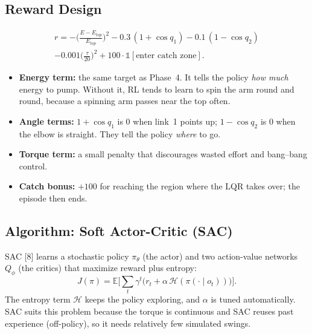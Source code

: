 \documentclass[12pt,a4paper]{article}
\begin{document}
\subsection{Reward Design}
\begin{multline}
r=-\Big(\frac{E-E_{top}}{E_{top}}\Big)^2-0.3\,(1+\cos q_1)-0.1\,(1-\cos q_2)\\
-0.001\Big(\frac{\tau}{20}\Big)^2+100\cdot\mathbb 1[\text{enter catch zone}] .
\end{multline}
\begin{itemize}
\item \textbf{Energy term:} the same target as Phase~4. It tells the policy \emph{how much} energy to pump. Without it, RL tends to learn to spin the arm round and round, because a spinning arm passes near the top often.
\item \textbf{Angle terms:} $1+\cos q_1$ is 0 when link~1 points up; $1-\cos q_2$ is 0 when the elbow is straight. They tell the policy \emph{where} to go.
\item \textbf{Torque term:} a small penalty that discourages wasted effort and bang--bang control.
\item \textbf{Catch bonus:} $+100$ for reaching the region where the LQR takes over; the episode then ends.
\end{itemize}

\subsection{Algorithm: Soft Actor-Critic (SAC)}
SAC [8] learns a stochastic policy $\pi_\theta$ (the actor) and two action-value networks $Q_\phi$ (the critics) that maximize reward plus entropy:
\begin{equation}
J(\pi)=\mathbb E\Big[\sum_t\gamma^t\big(r_t+\alpha\,\mathcal H(\pi(\cdot\mid o_t))\big)\Big].
\end{equation}
The entropy term $\mathcal H$ keeps the policy exploring, and $\alpha$ is tuned automatically. SAC suits this problem because the torque is continuous and SAC reuses past experience (off-policy), so it needs relatively few simulated swings.
\begin{table}[H]
\centering
\caption{Training settings (stable-baselines3 [9])}
\end{table}
\end{document}
